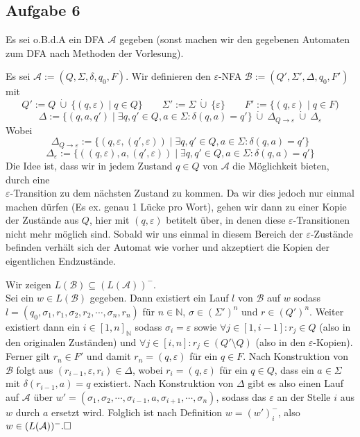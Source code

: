 \documentclass[a4paper,graphics,11pt]{article}
\newcommand{\aufgabe}[1]{\subsection*{Aufgabe #1}}
\begin{document}
\newpage
\aufgabe{6}
Es sei o.B.d.A ein DFA $\mathcal{A}$ gegeben (sonst machen wir den gegebenen Automaten zum DFA nach Methoden
der Vorlesung).

Es sei $\mathcal{A} := (Q, \Sigma, \delta, q_0, F)$.
Wir definieren den $\varepsilon$-NFA $\mathcal{B} := (Q', \Sigma', \Delta, q_0, F')$ mit
$$
    Q' := Q\ \dot\cup\ \{(q, \varepsilon) \mid q \in Q\}
    \qquad \Sigma' := \Sigma\ \dot\cup\ \{\varepsilon\}
    \qquad F' := \{(q, \varepsilon) \mid q \in F)
$$$$
    \Delta := \{(q, a, q') \mid \exists q,q' \in Q, a \in \Sigma : \delta(q, a) = q'\}\ \dot\cup\ \Delta_{Q \to \varepsilon}\ \dot\cup\ \Delta_\varepsilon
$$
Wobei
$$
    \Delta_{Q \to \varepsilon} := \{(q, \varepsilon, (q', \varepsilon)) \mid \exists q,q' \in Q, a \in \Sigma : \delta(q, a) = q'\}
$$$$
    \Delta_\varepsilon := \{((q, \varepsilon), a, (q', \varepsilon)) \mid \exists q,q' \in Q, a \in \Sigma : \delta(q, a) = q'\}
$$
Die Idee ist, dass wir in jedem Zustand $q \in Q$ von $\mathcal{A}$ die Möglichkeit bieten, durch eine\\
$\varepsilon$-Transition zu dem nächsten Zustand zu kommen. Da wir dies jedoch nur einmal machen dürfen
(Es ex. genau 1 Lücke pro Wort), gehen wir dann zu einer Kopie der Zustände aus $Q$, hier mit $(q, \varepsilon)$
betitelt über, in denen diese $\varepsilon$-Transitionen nicht mehr möglich sind. Sobald wir uns einmal in diesem
Bereich der $\varepsilon$-Zustände befinden verhält sich der Automat wie vorher und akzeptiert die Kopien der
eigentlichen Endzustände.

Wir zeigen $L(\mathcal{B}) \subseteq (L(\mathcal{A}))^-$.\\[2pt]
Sei ein $w \in L(\mathcal{B})$ gegeben. Dann existiert ein Lauf $l$ von $\mathcal{B}$ auf
$w$ sodass $l = (q_0, \sigma_1, r_1, \sigma_2, r_2, \cdots, \sigma_n, r_n)$ für $n \in \mathbb{N}$, $\sigma \in (\Sigma')^n$ und $r \in (Q')^n$.
Weiter existiert dann ein $i \in [1, n]_\mathbb{N}$ sodass $\sigma_i = \varepsilon$ sowie
$\forall j \in [1, i-1] : r_j \in Q$ (also in den originalen Zuständen) und
$\forall j \in [i, n] : r_j \in (Q'\setminus Q)$ (also in den $\varepsilon$-Kopien).
Ferner gilt $r_n \in F'$ und damit $r_n = (q, \varepsilon)$ für ein $q \in F$.
Nach Konstruktion von $\mathcal{B}$ folgt aus $(r_{i-1}, \varepsilon, r_i) \in \Delta$,
wobei $r_i = (q, \varepsilon)$ für ein $q \in Q$, dass ein $a \in \Sigma$ mit
$\delta(r_{i-1}, a) = q$ existiert. Nach Konstruktion von $\Delta$ gibt es also einen Lauf auf $\mathcal{A}$ über
$w' = (\sigma_1, \sigma_2, \cdots, \sigma_{i-1}, a, \sigma_{i+1}, \cdots, \sigma_n)$, sodass
das $\varepsilon$ an der Stelle $i$ aus $w$ durch $a$ ersetzt wird. Folglich ist nach Definition
$w = (w')_i^-$, also $w \in (L(\mathcal{A}))^-. \hfill\square$
\end{document}
